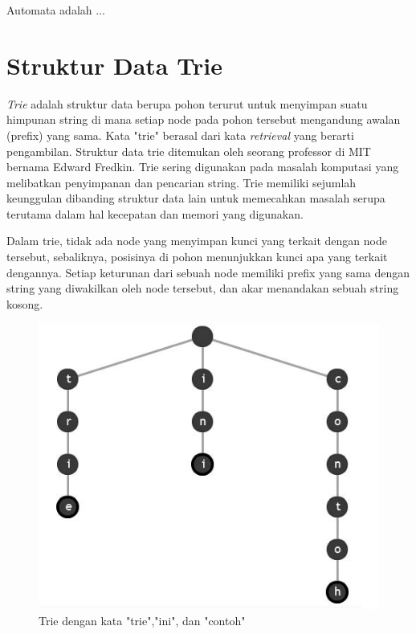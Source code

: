Automata adalah ...


\section{Struktur Data Trie}
\label{sec:trie}

\textit{Trie} adalah struktur data berupa pohon terurut untuk menyimpan suatu himpunan string di mana setiap node pada pohon tersebut mengandung awalan (prefix) yang sama\cite{najogie:10:trie}. Kata "trie" berasal dari kata \textit{retrieval} yang berarti pengambilan. Struktur data trie ditemukan oleh seorang professor di MIT bernama Edward Fredkin. Trie sering digunakan pada masalah komputasi yang melibatkan penyimpanan dan pencarian string. Trie memiliki sejumlah keunggulan dibanding struktur data lain untuk memecahkan masalah serupa terutama dalam hal kecepatan dan memori yang digunakan.

Dalam trie, tidak ada node yang menyimpan kunci yang terkait dengan node tersebut, sebaliknya, posisinya di pohon menunjukkan kunci apa yang terkait dengannya. Setiap keturunan dari sebuah node memiliki prefix yang sama dengan string yang diwakilkan oleh node tersebut, dan akar menandakan sebuah string kosong.

\begin{figure}[H]
\centering
\includegraphics[scale=1]{Gambar/contoh-trie-1}
\caption[Trie]{Trie dengan kata "trie","ini", dan "contoh"\cite{najogie:10:trie}} 
\label{contoh-trie-1}
\end{figure}

